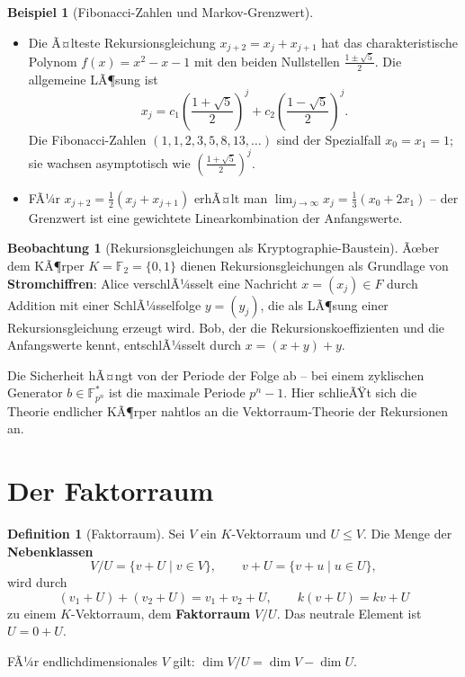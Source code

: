 ﻿\documentclass[a4paper,12pt]{report}
\theoremstyle{definition}
\newtheorem{definition}{Definition}
\newtheorem{beispiel}{Beispiel}
\newtheorem{beobachtung}{Beobachtung}
\begin{document}
\begin{beispiel}[Fibonacci-Zahlen und Markov-Grenzwert]
    \begin{itemize}
        \item[-] Die Ã¤lteste Rekursionsgleichung $x_{j+2} = x_j + x_{j+1}$
              hat das charakteristische Polynom $f(x) = x^2 - x - 1$ mit
              den beiden Nullstellen $\frac{1 \pm \sqrt{5}}{2}$. Die allgemeine
              LÃ¶sung ist
              \[
                  x_j = c_1 \left(\frac{1+\sqrt{5}}{2}\right)^j
                  + c_2 \left(\frac{1-\sqrt{5}}{2}\right)^j.
              \]
              Die Fibonacci-Zahlen $(1, 1, 2, 3, 5, 8, 13, \dots)$ sind
              der Spezialfall $x_0 = x_1 = 1$; sie wachsen asymptotisch
              wie $\left(\frac{1+\sqrt{5}}{2}\right)^j$.
        \item[-] FÃ¼r $x_{j+2} = \frac{1}{2}(x_j + x_{j+1})$ erhÃ¤lt man
              $\lim_{j\to\infty} x_j = \frac{1}{3}(x_0 + 2x_1)$ -- der
              Grenzwert ist eine gewichtete Linearkombination der Anfangswerte.
    \end{itemize}
\end{beispiel}

\begin{beobachtung}[Rekursionsgleichungen als Kryptographie-Baustein]
    Ãœber dem KÃ¶rper $K = \mathbb{F}_2 = \{0, 1\}$ dienen Rekursionsgleichungen
    als Grundlage von \textbf{Stromchiffren}: Alice verschlÃ¼sselt eine
    Nachricht $x = (x_j) \in F$ durch Addition mit einer SchlÃ¼sselfolge
    $y = (y_j)$, die als LÃ¶sung einer Rekursionsgleichung erzeugt wird.
    Bob, der die Rekursionskoeffizienten und die Anfangswerte kennt,
    entschlÃ¼sselt durch $x = (x + y) + y$.

    Die Sicherheit hÃ¤ngt von der Periode der Folge ab -- bei einem
    zyklischen Generator $b \in \mathbb{F}_{p^n}^*$ ist die maximale
    Periode $p^n - 1$. Hier schlieÃŸt sich die Theorie endlicher KÃ¶rper
    nahtlos an die Vektorraum-Theorie der Rekursionen an.
\end{beobachtung}

\section{Der Faktorraum}

\begin{definition}[Faktorraum]
    Sei $V$ ein $K$-Vektorraum und $U \leq V$. Die Menge der
    \textbf{Nebenklassen}
    \[
        V/U = \{v + U \mid v \in V\}, \qquad v + U = \{v + u \mid u \in U\},
    \]
    wird durch
    \[
        (v_1 + U) + (v_2 + U) = v_1 + v_2 + U, \qquad k(v + U) = kv + U
    \]
    zu einem $K$-Vektorraum, dem \textbf{Faktorraum} $V/U$. Das neutrale
    Element ist $U = 0 + U$.

    FÃ¼r endlichdimensionales $V$ gilt: $\dim V/U = \dim V - \dim U$.
\end{definition}
\end{document}

